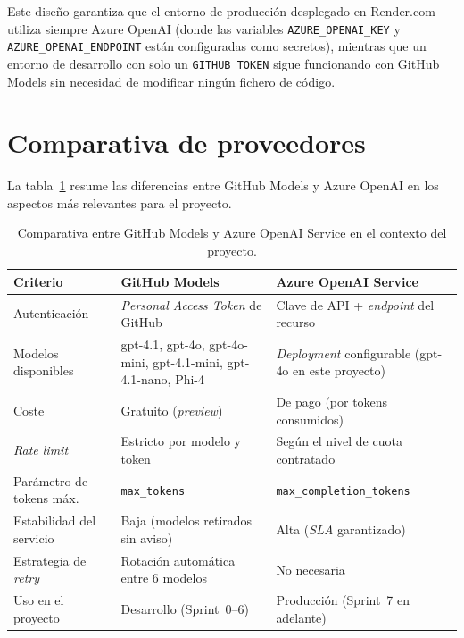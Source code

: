 Este diseño garantiza que el entorno de producción desplegado en Render.com utiliza siempre Azure OpenAI (donde las variables \texttt{AZURE\_OPENAI\_KEY} y \texttt{AZURE\_OPENAI\_ENDPOINT} están configuradas como secretos), mientras que un entorno de desarrollo con solo un \texttt{GITHUB\_TOKEN} sigue funcionando con GitHub Models sin necesidad de modificar ningún fichero de código.

\section{Comparativa de proveedores}
\label{sec:anx2-comparativa}

La tabla~\ref{tab:comparativaProveedores} resume las diferencias entre GitHub Models y Azure OpenAI en los aspectos más relevantes para el proyecto.

\begin{table}[H]
\centering
\caption{Comparativa entre GitHub Models y Azure OpenAI Service en el contexto del proyecto.}
\label{tab:comparativaProveedores}
\begin{tabular}{@{} p{3.8cm} p{4.8cm} p{4.8cm} @{}}
\hline
\rule{0pt}{10pt}\textbf{Criterio} & \textbf{GitHub Models} & \textbf{Azure OpenAI Service} \\
\hline
\rule{0pt}{10pt}Autenticación         & \textit{Personal Access Token} de GitHub & Clave de API + \textit{endpoint} del recurso \\[4pt]
Modelos disponibles      & gpt-4.1, gpt-4o, gpt-4o-mini, gpt-4.1-mini, gpt-4.1-nano, Phi-4 & \textit{Deployment} configurable (gpt-4o en este proyecto) \\[4pt]
Coste                    & Gratuito (\textit{preview}) & De pago (por tokens consumidos) \\[4pt]
\textit{Rate limit}      & Estricto por modelo y token & Según el nivel de cuota contratado \\[4pt]
Parámetro de tokens máx. & \texttt{max\_tokens} & \texttt{max\_completion\_tokens} \\[4pt]
Estabilidad del servicio & Baja (modelos retirados sin aviso) & Alta (\textit{SLA} garantizado) \\[4pt]
Estrategia de \textit{retry} & Rotación automática entre 6 modelos & No necesaria \\[4pt]
Uso en el proyecto       & Desarrollo (Sprint~0--6) & Producción (Sprint~7 en adelante) \\[4pt]
\hline
\end{tabular}
\end{table}

